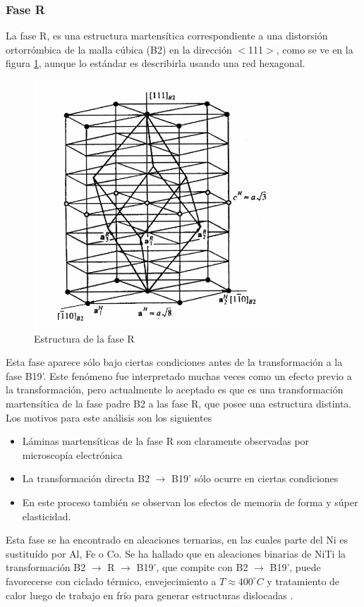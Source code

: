 \documentclass{article}
\theoremstyle{definition}
\theoremstyle{remark}
\begin{document}
\subsubsection{Fase R}
La fase R, es una estructura martensítica correspondiente a una distorsión
ortorrómbica de la malla cúbica (B2) en la dirección $<$111$>$, como se ve en la figura \ref{RPhase}, aunque lo estándar es describirla usando una red hexagonal.
\begin{figure}[H]
	\centering	
	\includegraphics[scale=0.4]{img/RPhase.png}
	\caption{Estructura de la fase R}
	\label{RPhase}
\end{figure}

Esta fase aparece sólo bajo ciertas condiciones antes de la transformación a la fase B19'. Este fenómeno fue interpretado muchas veces como un efecto previo a la transformación, pero actualmente lo aceptado es que es una transformación martensítica de la fase padre B2 a las fase R, que posee una estructura distinta. Los motivos para este análisis son los siguientes
\begin{itemize}
	\item Láminas martensíticas de la fase R son claramente observadas por microscopía electrónica
	\item La transformación directa B2 $\rightarrow$ B19' sólo ocurre en ciertas condiciones
	\item En este proceso también se observan los efectos de memoria de forma y súper elasticidad.
\end{itemize}


Esta fase se ha encontrado en aleaciones ternarias, en las cuales parte del Ni es sustituído por Al, Fe o Co. Se ha hallado que en  aleaciones binarias de NiTi la transformación B2 $\rightarrow$ R $\rightarrow$ B19', que compite con B2 $\rightarrow$ B19', puede favorecerse con ciclado térmico, envejecimiento a $T \approx 400 ^\circ C$ y tratamiento de calor luego de trabajo en frío para generar estructuras dislocadas \citep{Santamarta}\citep{ThinFilm}\cite{TiNi}. 
\end{document}
